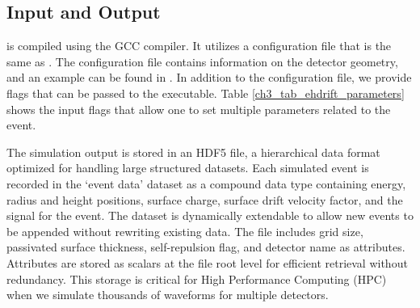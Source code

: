 \subsection{Input and Output}
{\ehd} is compiled using the GCC compiler. It utilizes a configuration file that is the same as {\siggen}. The configuration file contains information on the detector geometry, and an example can be found in \cite{ehdrift2024}. In addition to the configuration file, we provide flags that can be passed to the executable. Table \ref{ch3_tab_ehdrift_parameters} shows the input flags that allow one to set multiple parameters related to the event.



The simulation output is stored in an HDF5 file, a hierarchical data format optimized for handling large structured datasets. Each simulated event is recorded in the `event data' dataset as a compound data type containing energy, radius and height positions, surface charge, surface drift velocity factor, and the signal for the event. The dataset is dynamically extendable to allow new events to be appended without rewriting existing data. The file includes grid size, passivated surface thickness, self-repulsion flag, and detector name as attributes. Attributes are stored as scalars at the file root level for efficient retrieval without redundancy. This storage is critical for High Performance Computing (HPC) when we simulate thousands of waveforms for multiple detectors.


